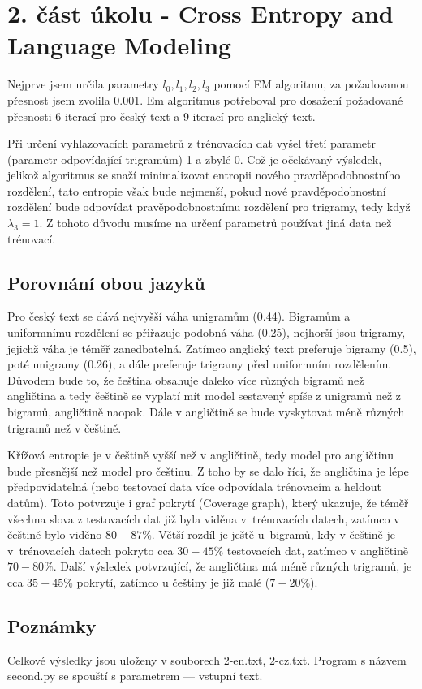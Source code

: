 \documentclass[12pt, a4paper]{report}
\theoremstyle{remark}
\begin{document}
\section*{2. část úkolu - Cross Entropy and Language Modeling}

Nejprve jsem určila parametry $l_0, l_1, l_2, l_3$ pomocí EM algoritmu, za požadovanou přesnost jsem zvolila 0.001. Em algoritmus potřeboval pro dosažení požadované přesnosti 6 iterací pro český text a 9 iterací pro anglický text.

Při určení vyhlazovacích parametrů z trénovacích dat vyšel třetí parametr (parametr odpovídající trigramům) 1 a zbylé 0. Což je očekávaný výsledek, jelikož algoritmus se snaží minimalizovat entropii nového pravděpodobnostního rozdělení, tato entropie však bude nejmenší, pokud nové pravděpodobnostní rozdělení bude odpovídat pravěpodobnostnímu rozdělení pro trigramy, tedy když $\lambda_3=1$. Z tohoto důvodu musíme na určení parametrů používat jiná data než trénovací.

\subsection*{Porovnání obou jazyků}
Pro český text se dává nejvyšší váha unigramům (0.44). Bigramům a uniformnímu rozdělení se přiřazuje podobná váha (0.25), nejhorší jsou trigramy, jejichž váha je téměř zanedbatelná. Zatímco anglický text preferuje bigramy (0.5), poté unigramy (0.26), a dále preferuje trigramy před uniformním rozdělením. Důvodem bude to, že čeština obsahuje daleko více různých bigramů než angličtina a tedy češtině se vyplatí mít model sestavený spíše z unigramů než z bigramů, angličtině naopak. Dále v angličtině se bude vyskytovat méně různých trigramů než v češtině.

Křížová entropie je v češtině vyšší než v angličtině, tedy model pro angličtinu bude přesnější než model pro češtinu. Z toho by se dalo říci, že angličtina je lépe předpovídatelná (nebo testovací data více odpovídala trénovacím a heldout datům). Toto potvrzuje i graf pokrytí (Coverage graph), který ukazuje, že téměř všechna slova z testovacích dat již byla viděna v~trénovacích datech, zatímco v češtině bylo viděno $80-87 \%$. Větší rozdíl je ještě u~bigramů, kdy v češtině je v~trénovacích datech pokryto cca $30-45 \%$ testovacích dat, zatímco v angličtině $70-80 \%$. Další výsledek potvrzující, že angličtina má méně různých trigramů, je cca $35-45\%$ pokrytí, zatímco u češtiny je již malé ($7-20\%$).

\subsection*{Poznámky}
Celkové výsledky jsou uloženy v souborech 2-en.txt, 2-cz.txt. Program s názvem second.py se spouští s parametrem --- vstupní text.
\end{document}
